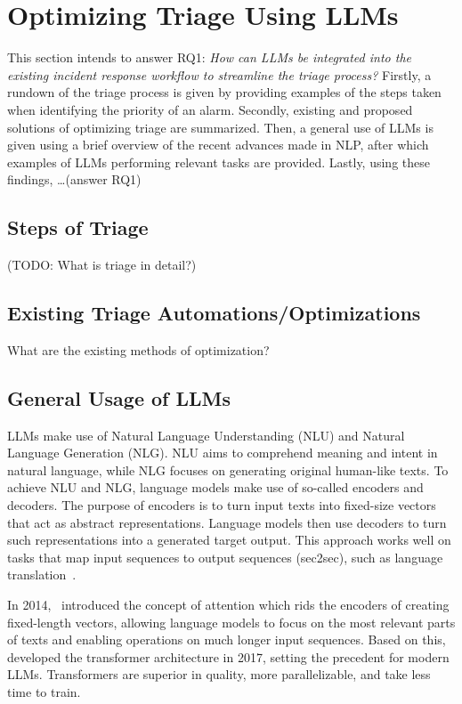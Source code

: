 \section{Optimizing Triage Using LLMs}
\label{sec:rq1}

This section intends to answer RQ1: \textit{How can LLMs be integrated into the existing incident response workflow to
streamline the triage process?}
Firstly, a rundown of the triage process is given by providing examples of the steps taken when identifying the priority
of an alarm.
Secondly, existing and proposed solutions of optimizing triage are summarized.
Then, a general use of LLMs is given using a brief overview of the recent advances made in NLP\@, after which examples
of LLMs performing relevant tasks are provided.
Lastly, using these findings, \dots (answer RQ1) %

\subsection{Steps of Triage}
\label{subsec:rq1-steps-of-triage}

(TODO: What is triage in detail?) %

\subsection{Existing Triage Automations/Optimizations}
\label{subsec:rq1-existing-optimizations}

What are the existing methods of optimization?

\subsection{General Usage of LLMs}
\label{subsec:rq1-use-of-llms}

LLMs make use of Natural Language Understanding (NLU) and Natural Language Generation (NLG).
NLU aims to comprehend meaning and intent in natural language, while NLG focuses on generating original human-like
texts.
To achieve NLU and NLG, language models make use of so-called encoders and decoders.
The purpose of encoders is to turn input texts into fixed-size vectors that act as abstract representations.
Language models then use decoders to turn such representations into a generated target output.
This approach works well on tasks that map input sequences to output sequences (sec2sec), such as language
translation\ \citep{sutskever2014sequence, cho2014learning}.

In 2014,\ \citet{bahdanau2014neural} introduced the concept of attention which rids the encoders of creating
fixed-length vectors, allowing language models to focus on the most relevant parts of texts and enabling operations on
much longer input sequences.
Based on this,\ \citet{vaswani2017attention} developed the transformer architecture in 2017, setting the precedent for
modern LLMs.
Transformers are superior in quality, more parallelizable, and take less time to train.

